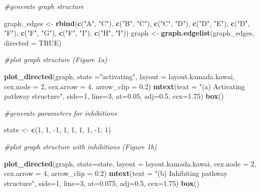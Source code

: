 \documentclass[]{article}
\newenvironment{Shaded}{\begin{snugshade}}{\end{snugshade}}
\newcommand{\CommentTok}[1]{\textcolor[rgb]{0.56,0.35,0.01}{\textit{#1}}}
\newcommand{\DataTypeTok}[1]{\textcolor[rgb]{0.13,0.29,0.53}{#1}}
\newcommand{\DecValTok}[1]{\textcolor[rgb]{0.00,0.00,0.81}{#1}}
\newcommand{\FloatTok}[1]{\textcolor[rgb]{0.00,0.00,0.81}{#1}}
\newcommand{\KeywordTok}[1]{\textcolor[rgb]{0.13,0.29,0.53}{\textbf{#1}}}
\newcommand{\NormalTok}[1]{#1}
\newcommand{\OtherTok}[1]{\textcolor[rgb]{0.56,0.35,0.01}{#1}}
\newcommand{\StringTok}[1]{\textcolor[rgb]{0.31,0.60,0.02}{#1}}
\begin{document}
\begin{Shaded}
\begin{Highlighting}[]
\CommentTok{#generate graph structure}

\NormalTok{graph_edges <-}\StringTok{ }\KeywordTok{rbind}\NormalTok{(}\KeywordTok{c}\NormalTok{(}\StringTok{"A"}\NormalTok{, }\StringTok{"C"}\NormalTok{), }\KeywordTok{c}\NormalTok{(}\StringTok{"B"}\NormalTok{, }\StringTok{"C"}\NormalTok{), }\KeywordTok{c}\NormalTok{(}\StringTok{"C"}\NormalTok{, }\StringTok{"D"}\NormalTok{), }\KeywordTok{c}\NormalTok{(}\StringTok{"D"}\NormalTok{, }\StringTok{"E"}\NormalTok{),}
                     \KeywordTok{c}\NormalTok{(}\StringTok{"D"}\NormalTok{, }\StringTok{"F"}\NormalTok{), }\KeywordTok{c}\NormalTok{(}\StringTok{"F"}\NormalTok{, }\StringTok{"G"}\NormalTok{), }\KeywordTok{c}\NormalTok{(}\StringTok{"F"}\NormalTok{, }\StringTok{"I"}\NormalTok{), }\KeywordTok{c}\NormalTok{(}\StringTok{"H"}\NormalTok{, }\StringTok{"I"}\NormalTok{))}
\NormalTok{graph <-}\StringTok{ }\KeywordTok{graph.edgelist}\NormalTok{(graph_edges, }\DataTypeTok{directed =} \OtherTok{TRUE}\NormalTok{)}

\CommentTok{#plot graph structure (Figure 1a)}

\KeywordTok{plot_directed}\NormalTok{(graph, }\DataTypeTok{state =}\StringTok{"activating"}\NormalTok{, }\DataTypeTok{layout =}\NormalTok{ layout.kamada.kawai,}
              \DataTypeTok{cex.node =} \DecValTok{2}\NormalTok{, }\DataTypeTok{cex.arrow =} \DecValTok{4}\NormalTok{, }\DataTypeTok{arrow_clip =} \FloatTok{0.2}\NormalTok{)}
\KeywordTok{mtext}\NormalTok{(}\DataTypeTok{text =} \StringTok{"(a) Activating pathway structure"}\NormalTok{, }\DataTypeTok{side=}\DecValTok{1}\NormalTok{, }\DataTypeTok{line=}\DecValTok{3}\NormalTok{, }\DataTypeTok{at=}\FloatTok{0.05}\NormalTok{, }\DataTypeTok{adj=}\FloatTok{0.5}\NormalTok{, }\DataTypeTok{cex=}\FloatTok{1.75}\NormalTok{)}
\KeywordTok{box}\NormalTok{()}

\CommentTok{#generate parameters for inhibitions}

\NormalTok{state <-}\StringTok{ }\KeywordTok{c}\NormalTok{(}\DecValTok{1}\NormalTok{, }\DecValTok{1}\NormalTok{, }\DecValTok{-1}\NormalTok{, }\DecValTok{1}\NormalTok{, }\DecValTok{1}\NormalTok{, }\DecValTok{1}\NormalTok{, }\DecValTok{1}\NormalTok{, }\DecValTok{-1}\NormalTok{, }\DecValTok{1}\NormalTok{)}

\CommentTok{#plot graph structure with inhibitions (Figure 1b)}

\KeywordTok{plot_directed}\NormalTok{(graph, }\DataTypeTok{state=}\NormalTok{state, }\DataTypeTok{layout =}\NormalTok{ layout.kamada.kawai,}
              \DataTypeTok{cex.node =} \DecValTok{2}\NormalTok{, }\DataTypeTok{cex.arrow =} \DecValTok{4}\NormalTok{, }\DataTypeTok{arrow_clip =} \FloatTok{0.2}\NormalTok{)}
\KeywordTok{mtext}\NormalTok{(}\DataTypeTok{text =} \StringTok{"(b) Inhibiting pathway structure"}\NormalTok{, }\DataTypeTok{side=}\DecValTok{1}\NormalTok{, }\DataTypeTok{line=}\DecValTok{3}\NormalTok{, }\DataTypeTok{at=}\FloatTok{0.075}\NormalTok{, }\DataTypeTok{adj=}\FloatTok{0.5}\NormalTok{, }\DataTypeTok{cex=}\FloatTok{1.75}\NormalTok{)}
\KeywordTok{box}\NormalTok{()}
\end{Highlighting}
\end{Shaded}
\end{document}
